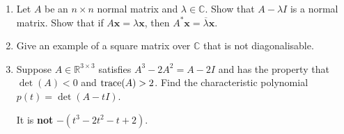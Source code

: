 \documentclass[12pt]{article}
\begin{document}
\begin{enumerate}[leftmargin=*]
	 \item Let $A$ be an $n \times n$ normal matrix and $\lambda \in \mathbb{C}$. \newline
	 Show that $A - \lambda I$ is a normal matrix. \newline
	 Show that if $A \mathbf{x} = \lambda \mathbf{x}$, then $A^{\ast} \mathbf{x} = \overline{\lambda} \mathbf{x}$.
	 \item Give an example of a square matrix over $\mathbb{C}$ that is not diagonalisable.
	 \item Suppose $A \in \mathbb{R}^{3 \times 3}$ satisfies $A^{3} - 2A^{2} = A - 2I$ and has the property that $\det(A) < 0$ and $\operatorname{trace}(A) > 2$. \newline
	 Find the characteristic polynomial $p(t) = \det(A - tI)$.

	 {\color{gray} It is \textbf{not} $-(t^{3} - 2t^{2} - t + 2)$.}
\end{enumerate}
\end{document}

